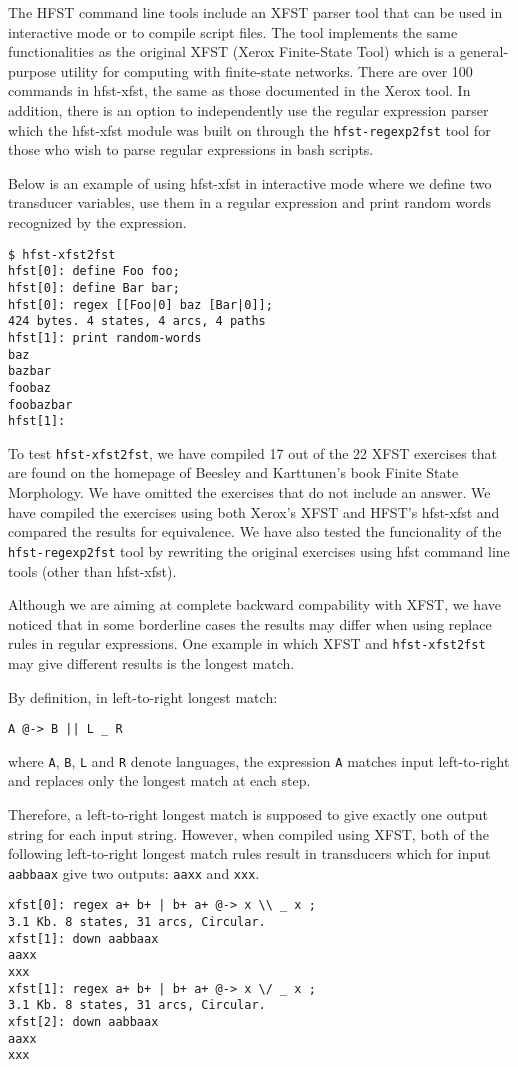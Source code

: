 \documentclass{llncs}
\begin{document}
The HFST command line tools include an XFST parser tool that can be used
in interactive mode or to compile script files. The tool implements the
same functionalities as the original XFST (Xerox Finite-State Tool)
which is a general-purpose utility for computing with finite-state
networks. There are over 100 commands in hfst-xfst, the same as those documented in the
Xerox tool. In addition, there is an option to independently use
the regular expression parser which the hfst-xfst module was built on through the
\verb+hfst-regexp2fst+ tool for those who wish to parse
regular expressions in bash scripts.

Below is an example of using hfst-xfst in interactive
mode where we define two transducer variables, use them in a regular
expression and print random words recognized by the expression.

\begin{verbatim}
$ hfst-xfst2fst 
hfst[0]: define Foo foo;
hfst[0]: define Bar bar;
hfst[0]: regex [[Foo|0] baz [Bar|0]];
424 bytes. 4 states, 4 arcs, 4 paths
hfst[1]: print random-words
baz
bazbar
foobaz
foobazbar
hfst[1]: 
\end{verbatim}

To test \verb+hfst-xfst2fst+, we have compiled 17 out of the 22 XFST exercises
that are found on the homepage of Beesley and Karttunen's book Finite
State Morphology. We have omitted the exercises that do not include an
answer. We have compiled the exercises
using both Xerox's XFST and HFST's hfst-xfst and compared the results
for equivalence. We have also tested the funcionality of the
\verb+hfst-regexp2fst+ tool by rewriting the original exercises
using hfst command line tools (other than hfst-xfst).

Although we are aiming at complete backward compability with XFST, we
have noticed that in some borderline cases the results may differ 
when using replace rules in regular expressions.
One example in which XFST and \verb+hfst-xfst2fst+ may
give different results is the longest match.

By definition, in left-to-right longest match: 
\begin{verbatim}
A @-> B || L _ R
\end{verbatim}
where \verb+A+, \verb+B+, \verb+L+ and \verb+R+ denote languages, the
expression \verb+A+ matches input left-to-right and replaces only the longest
match at each step.

Therefore, a left-to-right longest match is supposed to give exactly one output
string for each input string. However, when compiled using XFST, both of the following left-to-right
longest match rules result in transducers which for input \verb+aabbaax+ give two outputs: \verb+aaxx+ and \verb+xxx+.
\begin{verbatim}
xfst[0]: regex a+ b+ | b+ a+ @-> x \\ _ x ;
3.1 Kb. 8 states, 31 arcs, Circular.
xfst[1]: down aabbaax
aaxx
xxx
xfst[1]: regex a+ b+ | b+ a+ @-> x \/ _ x ;
3.1 Kb. 8 states, 31 arcs, Circular.
xfst[2]: down aabbaax
aaxx
xxx
\end{verbatim}
\end{document}
